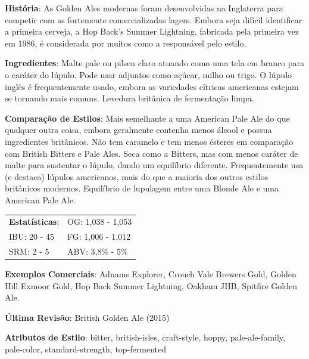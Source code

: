 \textbf{História}: As Golden Ales modernas foram desenvolvidas na Inglaterra para competir com as fortemente comercializadas lagers. Embora seja difícil identificar a primeira cerveja, a Hop Back's Summer Lightning, fabricada pela primeira vez em 1986, é considerada por muitos como a responsável pelo estilo.

\textbf{Ingredientes}: Malte pale ou pilsen claro atuando como uma tela em branco para o caráter do lúpulo. Pode usar adjuntos como açúcar, milho ou trigo. O lúpulo inglês é frequentemente usado, embora as variedades cítricas americanas estejam se tornando mais comuns. Levedura britânica de fermentação limpa.

\textbf{Comparação de Estilos}: Mais semelhante a uma American Pale Ale do que qualquer outra coisa, embora geralmente contenha menos álcool e possua ingredientes britânicos. Não tem caramelo e tem menos ésteres em comparação com British Bitters e Pale Ales. Seca como a Bitters, mas com menos caráter de malte para sustentar o lúpulo, dando um equilíbrio diferente. Frequentemente usa (e destaca) lúpulos americanos, mais do que a maioria dos outros estilos britânicos modernos. Equilíbrio de lupulagem entre uma Blonde Ale e uma American Pale Ale.

\begin{tabular}{@{}p{35mm}p{35mm}@{}}
  \textbf{Estatísticas}: & OG: 1,038 - 1,053 \\
  IBU: 20 - 45  & FG: 1,006 - 1,012  \\
  SRM: 2 - 5  & ABV: 3,8\% - 5\%
\end{tabular}

\textbf{Exemplos Comerciais}: Adnams Explorer, Crouch Vale Brewers Gold, Golden Hill Exmoor Gold, Hop Back Summer Lightning, Oakham JHB, Spitfire Golden Ale.

\textbf{Última Revisão}: British Golden Ale (2015)

\textbf{Atributos de Estilo}: bitter, british-isles, craft-style, hoppy, pale-ale-family, pale-color, standard-strength, top-fermented
